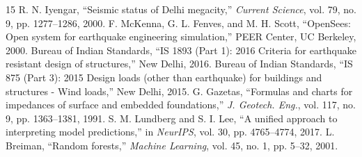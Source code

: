 \documentclass[journal,10pt,twocolumn]{IEEEtran}
\begin{document}
\begin{thebibliography}{15}
 R. N. Iyengar, ``Seismic status of Delhi megacity,'' \emph{Current Science}, vol. 79, no. 9, pp. 1277--1286, 2000.
 F. McKenna, G. L. Fenves, and M. H. Scott, ``OpenSees: Open system for earthquake engineering simulation,'' PEER Center, UC Berkeley, 2000.
 Bureau of Indian Standards, ``IS 1893 (Part 1): 2016 Criteria for earthquake resistant design of structures,'' New Delhi, 2016.
 Bureau of Indian Standards, ``IS 875 (Part 3): 2015 Design loads (other than earthquake) for buildings and structures - Wind loads,'' New Delhi, 2015.
 G. Gazetas, ``Formulas and charts for impedances of surface and embedded foundations,'' \emph{J. Geotech. Eng.}, vol. 117, no. 9, pp. 1363--1381, 1991.
 S. M. Lundberg and S. I. Lee, ``A unified approach to interpreting model predictions,'' in \emph{NeurIPS}, vol. 30, pp. 4765--4774, 2017.
 L. Breiman, ``Random forests,'' \emph{Machine Learning}, vol. 45, no. 1, pp. 5--32, 2001.
\end{thebibliography}
\end{document}
